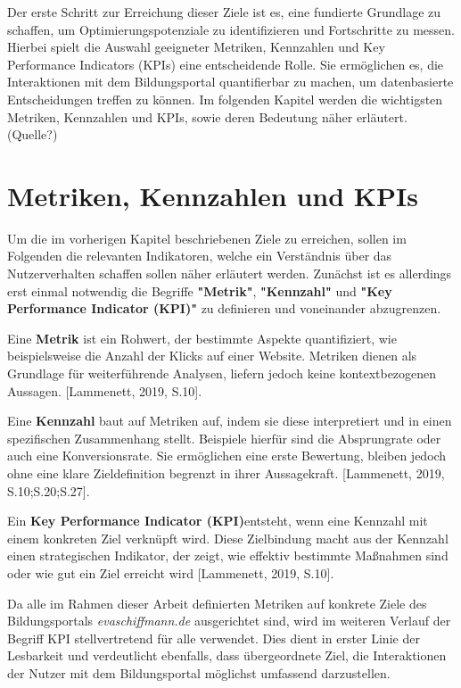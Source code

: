 Der erste Schritt zur Erreichung dieser Ziele ist es, eine fundierte Grundlage zu schaffen, um Optimierungspotenziale zu identifizieren und Fortschritte zu messen. Hierbei spielt die Auswahl geeigneter Metriken, Kennzahlen und Key Performance Indicators (KPIs) eine entscheidende Rolle. Sie ermöglichen es, die Interaktionen mit dem Bildungsportal quantifierbar zu machen, um datenbasierte Entscheidungen treffen zu können. Im folgenden Kapitel werden die wichtigsten Metriken, Kennzahlen und KPIs, sowie deren Bedeutung näher erläutert. (Quelle?)

\section{Metriken, Kennzahlen und KPIs} %
Um die im vorherigen Kapitel beschriebenen Ziele zu erreichen, sollen im Folgenden die relevanten Indikatoren, welche ein Verständnis über das Nutzerverhalten schaffen sollen näher erläutert werden. Zunächst ist es allerdings erst einmal notwendig die Begriffe \textbf{"Metrik"}, \textbf{"Kennzahl"} und \textbf{"Key Performance Indicator (KPI)"} zu definieren und voneinander abzugrenzen.

Eine \textbf{Metrik} ist ein Rohwert, der bestimmte Aspekte quantifiziert, wie beispielsweise die Anzahl der Klicks auf einer Website. Metriken dienen als Grundlage für weiterführende Analysen, liefern jedoch keine kontextbezogenen Aussagen. [Lammenett, 2019, S.10].

Eine \textbf{Kennzahl} baut auf Metriken auf, indem sie diese interpretiert und in einen spezifischen Zusammenhang stellt. Beispiele hierfür sind die Absprungrate oder auch eine Konversionsrate. Sie ermöglichen eine erste Bewertung, bleiben jedoch ohne eine klare Zieldefinition begrenzt in ihrer Aussagekraft. [Lammenett, 2019, S.10;S.20;S.27].

Ein \textbf{Key Performance Indicator (KPI)}entsteht, wenn eine Kennzahl mit einem konkreten Ziel verknüpft wird. Diese Zielbindung macht aus der Kennzahl einen strategischen Indikator, der zeigt, wie effektiv bestimmte Maßnahmen sind oder wie gut ein Ziel erreicht wird [Lammenett, 2019, S.10].

Da alle im Rahmen dieser Arbeit definierten Metriken auf konkrete Ziele des Bildungsportals \textit{evaschiffmann.de} ausgerichtet sind, wird im weiteren Verlauf der Begriff KPI stellvertretend für alle verwendet. Dies dient in erster Linie der Lesbarkeit und verdeutlicht ebenfalls, dass übergeordnete Ziel, die Interaktionen der Nutzer mit dem Bildungsportal möglichst umfassend darzustellen.

